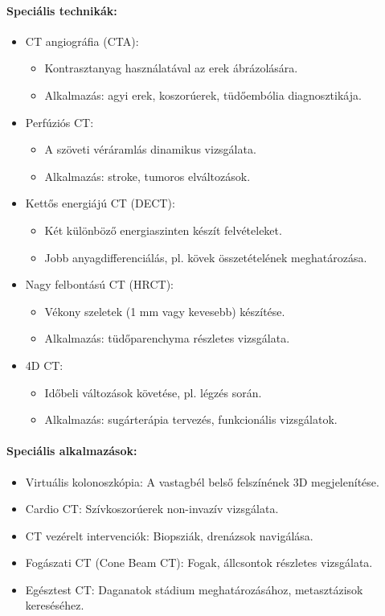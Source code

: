 \documentclass[a4paper,12pt]{article}
\begin{document}
\paragraph{Speciális technikák:} \begin{itemize} \item CT angiográfia (CTA): \begin{itemize} \item Kontrasztanyag használatával az erek ábrázolására. \item Alkalmazás: agyi erek, koszorúerek, tüdőembólia diagnosztikája. \end{itemize} \item Perfúziós CT: \begin{itemize} \item A szöveti véráramlás dinamikus vizsgálata. \item Alkalmazás: stroke, tumoros elváltozások. \end{itemize} \item Kettős energiájú CT (DECT): \begin{itemize} \item Két különböző energiaszinten készít felvételeket. \item Jobb anyagdifferenciálás, pl. kövek összetételének meghatározása. \end{itemize} \item Nagy felbontású CT (HRCT): \begin{itemize} \item Vékony szeletek (1 mm vagy kevesebb) készítése. \item Alkalmazás: tüdőparenchyma részletes vizsgálata. \end{itemize} \item 4D CT: \begin{itemize} \item Időbeli változások követése, pl. légzés során. \item Alkalmazás: sugárterápia tervezés, funkcionális vizsgálatok. \end{itemize} \end{itemize}

\paragraph{Speciális alkalmazások:} \begin{itemize} \item Virtuális kolonoszkópia: A vastagbél belső felszínének 3D megjelenítése. \item Cardio CT: Szívkoszorúerek non-invazív vizsgálata. \item CT vezérelt intervenciók: Biopsziák, drenázsok navigálása. \item Fogászati CT (Cone Beam CT): Fogak, állcsontok részletes vizsgálata. \item Egésztest CT: Daganatok stádium meghatározásához, metasztázisok kereséséhez. \end{itemize}
\end{document}
